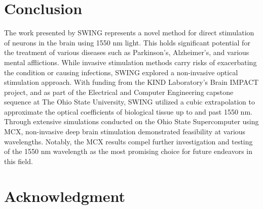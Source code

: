 \documentclass[journal,twoside,web]{ieeecolor}
\begin{document}
\section{Conclusion}
\label{sec:conclusion}
The work presented by SWING represents a novel method for direct stimulation of neurons in the brain using 1550 nm light. This holds significant potential 
for the treatment of various diseases such as Parkinson's, Alzheimer's, and various mental afflictions. 
While invasive stimulation methods carry risks of exacerbating the condition or causing infections, SWING explored a non-invasive optical stimulation approach. 
With funding from the KIND Laboratory's Brain IMPACT project, and as part of the Electrical and Computer Engineering capstone sequence at The Ohio State University, 
SWING utilized a cubic extrapolation to approximate the optical coefficients of biological tissue up to and past 1550 nm. Through extensive simulations conducted on 
the Ohio State Supercomputer using MCX, non-invasive deep brain stimulation demonstrated feasibility at various wavelengths. Notably, 
the MCX results compel further investigation and testing of the 1550 nm wavelength as the most promising choice for future endeavors in this field. 

\section*{Acknowledgment}
\end{document}
